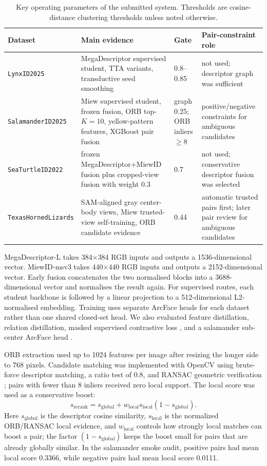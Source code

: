 \documentclass{ceurart}
\newcommand{\dataset}[1]{\texttt{#1}}
\begin{document}
\begin{table}[h]
  \centering
  \caption{Key operating parameters of the submitted system. Thresholds are cosine-distance clustering thresholds unless noted otherwise.}
  \label{tab:key-params}
  \small
  \begin{tabularx}{\linewidth}{lYlY}
    \toprule
    Dataset & Main evidence & Gate & Pair-constraint role \\
    \midrule
    \dataset{LynxID2025} & MegaDescriptor supervised student, TTA variants, transductive seed smoothing & 0.8--0.85 & not used; descriptor graph was sufficient \\
    \dataset{SalamanderID2025} & Miew supervised student, frozen fusion, ORB top-$K=10$, yellow-pattern features, XGBoost pair fusion & graph 0.25; ORB inliers $\geq$8 & positive/negative constraints for ambiguous candidates \\
    \dataset{SeaTurtleID2022} & frozen MegaDescriptor+MiewID fusion plus cropped-view fusion with weight 0.3 & 0.7 & not used; conservative descriptor fusion was selected \\
    \dataset{TexasHornedLizards} & SAM-aligned gray center-body views, Miew trusted-view self-training, ORB candidate evidence & 0.44 & automatic trusted pairs first; later pair review for ambiguous candidates \\
    \bottomrule
  \end{tabularx}
\end{table}

MegaDescriptor-L takes 384$\times$384 RGB inputs and outputs a 1536-dimensional vector. MiewID-msv3 takes 440$\times$440 RGB inputs and outputs a 2152-dimensional vector. Early fusion concatenates the two normalised blocks into a 3688-dimensional vector and normalises the result again. For supervised routes, each student backbone is followed by a linear projection to a 512-dimensional L2-normalised embedding. Training uses separate ArcFace heads \cite{arcface} for each dataset rather than one shared closed-set head. We also evaluated feature distillation, relation distillation, masked supervised contrastive loss \cite{supcon}, and a salamander sub-center ArcFace head \cite{arcface}.

ORB extraction used up to 1024 features per image after resizing the longer side to 768 pixels. Candidate matching was implemented with OpenCV \cite{opencv} using brute-force descriptor matching, a ratio test of 0.8, and RANSAC geometric verification \cite{ransac}; pairs with fewer than 8 inliers received zero local support. The local score was used as a conservative boost:
\begin{equation}
  s_{\mathrm{rerank}} = s_{\mathrm{global}} + w_{\mathrm{local}} s_{\mathrm{local}} (1 - s_{\mathrm{global}}).
\end{equation}
Here $s_{\mathrm{global}}$ is the descriptor cosine similarity, $s_{\mathrm{local}}$ is the normalized ORB/RANSAC local evidence, and $w_{\mathrm{local}}$ controls how strongly local matches can boost a pair; the factor $(1-s_{\mathrm{global}})$ keeps the boost small for pairs that are already globally similar.
In the salamander smoke audit, positive pairs had mean local score 0.3366, while negative pairs had mean local score 0.0111.
\end{document}
